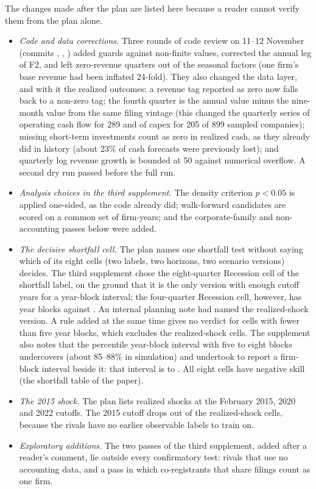 The changes made after the plan are listed here because a reader cannot verify them from the plan alone.
\begin{itemize}
\item \emph{Code and data corrections.} Three rounds of code review on 11--12 November (commits , , ) added guards against non-finite values, corrected the annual leg of F2, and left zero-revenue quarters out of the seasonal factors (one firm's base revenue had been inflated 24-fold). They also changed the data layer, and with it the realized outcomes: a revenue tag reported as zero now falls back to a non-zero tag; the fourth quarter is the annual value minus the nine-month value from the same filing vintage (this changed the quarterly series of operating cash flow for 289 and of capex for 205 of 899 sampled companies); missing short-term investments count as zero in realized cash, as they already did in history (about 23\% of cash forecasts were previously lost); and quarterly log revenue growth is bounded at 50 against numerical overflow. A second dry run passed before the full run.
\item \emph{Analysis choices in the third supplement.} The density criterion $p<0.05$ is applied one-sided, as the code already did; walk-forward candidates are scored on a common set of firm-years; and the corporate-family and non-accounting passes below were added.
\item \emph{The decisive shortfall cell.} The plan names one shortfall test without saying which of its eight cells (two labels, two horizons, two scenario versions) decides. The third supplement chose the eight-quarter Recession cell of the shortfall label, on the ground that it is the only version with enough cutoff years for a year-block interval; the four-quarter Recession cell, however, has \ShortBlocksFour{} year blocks against \ShortBlocksEight. An internal planning note had named the realized-shock version. A rule added at the same time gives no verdict for cells with fewer than five year blocks, which excludes the realized-shock cells. The supplement also notes that the percentile year-block interval with five to eight blocks undercovers (about 85--88\% in simulation) and undertook to report a firm-block interval beside it: that interval is \ShortFirmLo{} to \ShortFirmHi. All eight cells have negative skill (the shortfall table of the paper).
\item \emph{The 2015 shock.} The plan lists realized shocks at the February 2015, 2020 and 2022 cutoffs. The 2015 cutoff drops out of the realized-shock cells, because the rivals have no earlier observable labels to train on.
\item \emph{Exploratory additions.} The two passes of the third supplement, added after a reader's comment, lie outside every confirmatory test: rivals that use no accounting data, and a pass in which co-registrants that share filings count as one firm.
\end{itemize}
